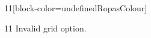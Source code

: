 \documentclass[paper=A4]{ropas-poster}
\begin{document}
\begin{postergrid}{1}{1}[block-color=undefinedRopasColour]
\begin{posterblock}{1}{1}
Invalid grid option.
\end{posterblock}
\end{postergrid}
\end{document}
